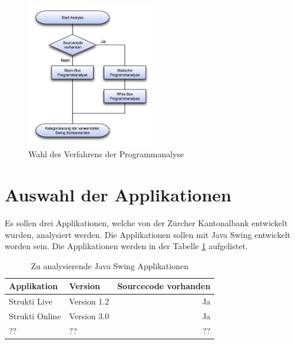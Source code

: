   \begin{figure}[ht]
    \begin{center}
      \includegraphics[width=0.5\textwidth]{./image/guiAnalyse.png}
      \caption{Wahl des Verfahrens der Programmanalyse}
      \label{img:guiAnalyse}
    \end{center}
  \end{figure}
  
  \section{Auswahl der Applikationen}
  
  Es sollen drei Applikationen, welche von der Zürcher Kantonalbank entwickelt
  wurden, analysiert werden. Die Applikationen sollen mit Java Swing entwickelt
  worden sein. Die Applikationen werden in der Tabelle
  \ref{tab:zuAnalysierendeJavaSwingApplikationen} aufgelistet.
  \newline
  
  \begin{table}[ht]
    \begin{center}
      \begin{tabular}{llr}
        \toprule
        Applikation & Version & Sourcecode vorhanden \\
        \midrule
        Strukti Live & Version 1.2 & Ja\\
        Strukti Online & Version 3.0 & Ja\\
        ?? & ?? & ??\\
        \bottomrule
      \end{tabular}
      \caption{Zu analysierende Java Swing Applikationen}
      \label{tab:zuAnalysierendeJavaSwingApplikationen}
    \end{center}
  \end{table}
  
